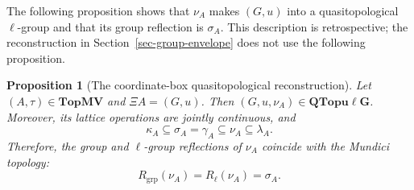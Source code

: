 \documentclass[preprint,3p]{elsarticle}
\theoremstyle{plain}
\newtheorem{prop}[thm]{Proposition}
\theoremstyle{definition}
\newcommand{\TopMV}{\mathbf{TopMV}}
\newcommand{\QTopulg}{\mathbf{QTopu\ell G}}
\numberwithin{equation}{section}
\begin{document}
The following proposition shows that $\nu_A$ makes $(G,u)$ into a 
quasitopological $\ell$-group and that its group reflection is $\sigma_A$.
This description is retrospective; the reconstruction in
Section~\ref{sec-group-envelope} does not use the following proposition.

\begin{prop}[The coordinate-box quasitopological reconstruction]
\label{prop-box-quasi-reconstruction}
Let $(A,\tau)\in\TopMV$ and $\Xi A=(G,u)$.
Then $(G,u,\nu_A)\in\QTopulg$.
Moreover, its lattice operations are jointly continuous, and
\[
 \kappa_A\subseteq\sigma_A=\gamma_A
 \subseteq\nu_A\subseteq\lambda_A.
\]
Therefore, the group and $\ell$-group reflections of $\nu_A$
coincide with the Mundici topology:
\begin{equation}
\label{eq-box-quasi-reflections}
 R_{\mathrm{grp}}(\nu_A)
 =R_\ell(\nu_A)=\sigma_A.
\end{equation}
\end{prop}
\end{document}
